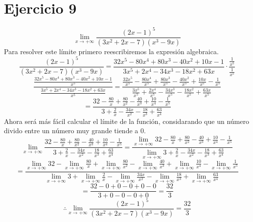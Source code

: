 \documentclass[12pt]{article}
\begin{document}
\section{Ejercicio 9}
\[
\lim_{x \to +\infty}\frac{(2x-1)^5}{(3x^2+2x-7)(x^3-9x)}
\]
Para resolver este límite primero reescribiremos la expresión algebraica.
\[
\frac{(2x-1)^5}{(3x^2+2x-7)(x^3-9x)} = \frac{32x^{5}-80x^{4}+80x^{3}-40x^{2}+10x-1}{3x^{5}+2x^{4}-34x^{3}-18x^{2}+63x} \cdot \frac{\frac{1}{x^{5}}}{\frac{1}{x^{5}}}
\]
\[
\frac{ \frac{32x^{5}-80x^{4}+80x^{3}-40x^{2}+10x-1 }{x^{5}}}{ \frac{3x^{5}+2x^{4}-34x^{3}-18x^{2}+63x}{x^{5}}} = \frac{  \frac{32x^{5}}{x^{5}} - \frac{80x^{4}}{x^{5}} + \frac{80x^{3}}{x^{5}} - \frac{40x^{2}}{x^{5}} + \frac{10x}{x^{5}}- \frac{1}{x^{5}} }{
\frac{3x^{5}}{x^{5}} + \frac{2x^{4}}{x^{5}} - \frac{34x^{3}}{x^{5}} - \frac{18x^{2}}{x^{5}} + \frac{63x}{x^{5}}}
\]
\[ =
\frac
{  
	32 - \frac{80}{x} + \frac{80}{x^{2}} - \frac{40}{x^{3}} + \frac{10}{x^{4}}- \frac{1}{x^{5}} 
}
{
	3 + \frac{2}{x} - \frac{34x}{x^{2}} - \frac{18}{x^{3}} + \frac{63}{x^{4}}
}
\]
Ahora será más fácil calcular el límite de la función, considarando que un número divido entre un número muy grande tiende a 0.
\[
\lim_{x \to +\infty}
\frac{  
	32 - \frac{80}{x} + \frac{80}{x^{2}} - \frac{40}{x^{3}} + \frac{10}{x^{4}}- \frac{1}{x^{5}} 
}{
	3 + \frac{2}{x} - \frac{34x}{x^{2}} - \frac{18}{x^{3}} + \frac{63}{x^{4}}
}
= \frac{\lim_{x \to +\infty}
	32 - \frac{80}{x} + \frac{80}{x^{2}} - \frac{40}{x^{3}} + \frac{10}{x^{4}}- \frac{1}{x^{5}} 
}{\lim_{x \to +\infty}
	3 + \frac{2}{x} - \frac{34x}{x^{2}} - \frac{18}{x^{3}} + \frac{63}{x^{4}}}
\]
\[=\frac{
	\lim_{x \to +\infty}32 - 
	\lim_{x \to +\infty}\frac{80}{x} + 
	\lim_{x \to +\infty}\frac{80}{x^{2}} - 
	\lim_{x \to +\infty}\frac{40}{x^{3}} + 
	\lim_{x \to +\infty}\frac{10}{x^{4}}- 
	\lim_{x \to +\infty}\frac{1}{x^{5}} 
}{
	\lim_{x \to +\infty}3 + 
	\lim_{x \to +\infty}\frac{2}{x} - 
	\lim_{x \to +\infty}\frac{34x}{x^{2}} - 
	\lim_{x \to +\infty}\frac{18}{x^{3}} + 
	\lim_{x \to +\infty}\frac{63}{x^{4}}}
\]
\[
= \frac{32 - 0 + 0 - 0 + 0- 0 }{3 + 0- 0-0+ 0}
= \frac{32}{3}
\]
\[
\therefore \lim_{x \to +\infty}\frac{(2x-1)^5}{(3x^2+2x-7)(x^3-9x)} = \frac{32}{3}
\]
\end{document}
